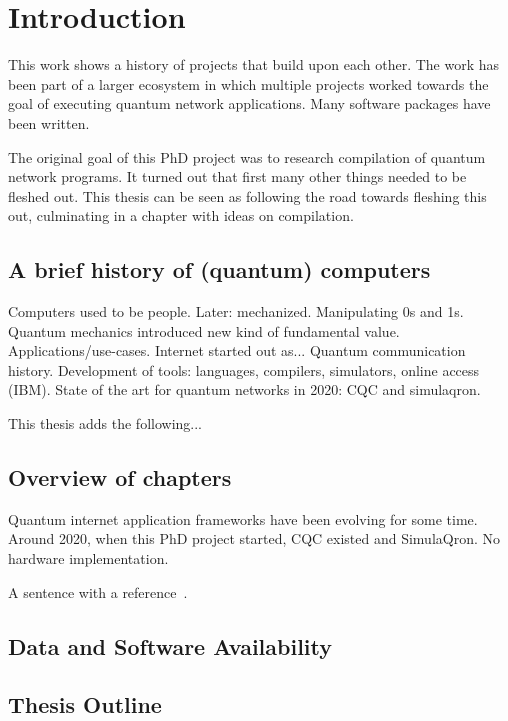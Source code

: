 \chapter{Introduction}
\label{chp:intro}

This work shows a history of projects that build upon each other.
The work has been part of a larger ecosystem in which multiple projects worked towards the goal of executing quantum network applications.
Many software packages have been written.

The original goal of this PhD project was to research compilation of quantum network programs.
It turned out that first many other things needed to be fleshed out.
This thesis can be seen as following the road towards fleshing this out, culminating in a chapter with ideas on compilation.

\section{A brief history of (quantum) computers}
Computers used to be people.
Later: mechanized. Manipulating 0s and 1s.
Quantum mechanics introduced new kind of fundamental value.
Applications/use-cases.
Internet started out as...
Quantum communication history.
Development of tools: languages, compilers, simulators, online access (IBM).
State of the art for quantum networks in 2020: CQC and simulaqron.

This thesis adds the following...

\section{Overview of chapters}
Quantum internet application frameworks have been evolving for some time.
Around 2020, when this PhD project started, CQC existed and SimulaQron.
No hardware implementation.

\lipsum[40-50]
A sentence with a reference~\cite{dahlberg_2022_netqasm}.


\section{Data and Software Availability}
\lipsum[51]


\section{Thesis Outline}
\lipsum[52]


\begin{xstretch}
\printbibliography[heading=subbibintoc,title={References},notcategory=noprint]
\end{xstretch}
